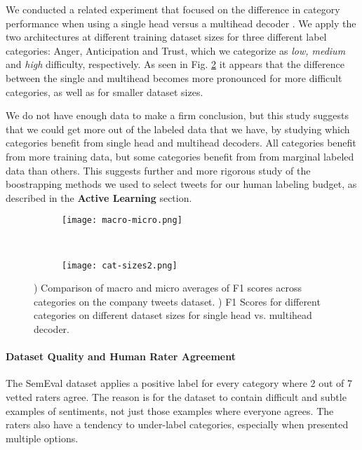 \documentclass[letterpaper]{article} \usepackage{aaai19}  \usepackage{times}  \usepackage{helvet}  \usepackage{courier}  \usepackage{url}  \usepackage{graphicx}  \usepackage{booktabs}
\begin{document}
We conducted a related experiment that focused on the difference in category performance when using a single head versus a multihead decoder . We apply the two architectures at different training dataset sizes  for three different label categories: Anger, Anticipation and Trust, which we categorize as \textit{low, medium} and \textit{high} difficulty, respectively. As seen in Fig. \ref{fig:cat-sizes} it appears that the difference between the single and multihead becomes more pronounced for more difficult categories, as well as for smaller dataset sizes. 

We do not have enough data to make a firm conclusion, but this study suggests that we could get more out of the labeled data that we have, by studying which categories benefit from single head and multihead decoders. All categories benefit from more training data, but some categories benefit from from marginal labeled data than others. This suggests further and more rigorous study of the boostrapping methods we used to select tweets for our human labeling budget, as described in the \textbf{Active Learning} section.

\begin{figure*}[htpb!]
\centering
    \begin{subfigure}[t]{0.263\textwidth}
        \centering
        \caption{\label{fig:macro-micro}}
        \texttt{[image: macro-micro.png]}
\end{subfigure}
    ~ 
    \begin{subfigure}[t]{0.717\textwidth}
        \centering
        \caption{\label{fig:cat-sizes}}
        \texttt{[image: cat-sizes2.png]}
\end{subfigure}\caption{) Comparison of macro and micro averages of F1 scores across categories on the company tweets dataset. ) F1 Scores for different categories on different dataset sizes for single head vs. multihead decoder.}
    \label{fig:data-fractions}
\end{figure*}



\paragraph{Dataset Quality and Human Rater Agreement}
The SemEval dataset \cite{SemEval2018Task1} applies a positive label for every category where 2 out of 7 vetted raters agree. The reason is for the dataset to contain difficult and subtle examples of sentiments, not just those examples where everyone agrees. The raters also have a tendency to under-label categories, especially when presented multiple options. 
\end{document}
